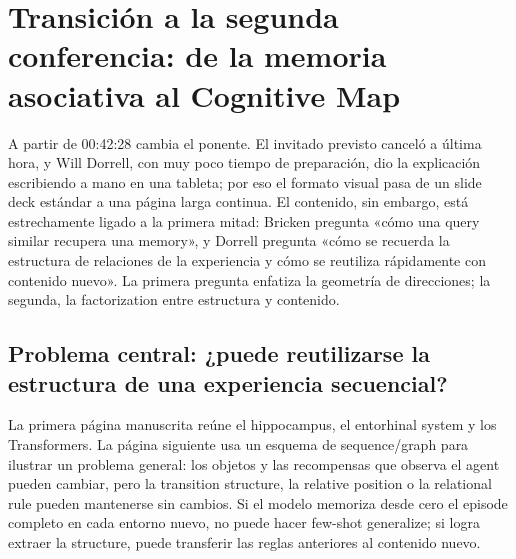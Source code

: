 \section{Transición a la segunda conferencia: de la memoria asociativa al Cognitive Map}

A partir de 00:42:28 cambia el ponente. El invitado previsto canceló a última hora, y Will Dorrell, con muy poco tiempo de preparación, dio la explicación escribiendo a mano en una tableta; por eso el formato visual pasa de un slide deck estándar a una página larga continua. El contenido, sin embargo, está estrechamente ligado a la primera mitad: Bricken pregunta «cómo una query similar recupera una memory», y Dorrell pregunta «cómo se recuerda la estructura de relaciones de la experiencia y cómo se reutiliza rápidamente con contenido nuevo». La primera pregunta enfatiza la geometría de direcciones; la segunda, la factorization entre estructura y contenido.

\subsection{Problema central: ¿puede reutilizarse la estructura de una experiencia secuencial?}

La primera página manuscrita reúne el hippocampus, el entorhinal system y los Transformers. La página siguiente usa un esquema de sequence/graph para ilustrar un problema general: los objetos y las recompensas que observa el agent pueden cambiar, pero la transition structure, la relative position o la relational rule pueden mantenerse sin cambios. Si el modelo memoriza desde cero el episode completo en cada entorno nuevo, no puede hacer few-shot generalize; si logra extraer la structure, puede transferir las reglas anteriores al contenido nuevo.




